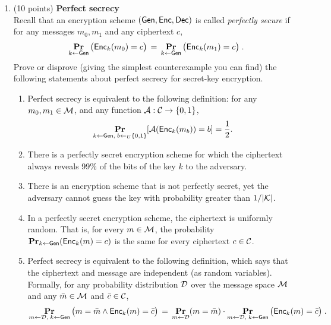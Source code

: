 \documentclass[12pt]{article}
\begin{document}
\begin{enumerate}
		

\item {(10 points)} {\bf Perfect secrecy}\\
Recall that an encryption scheme $ (\mathsf{Gen}, \mathsf{Enc}, \mathsf{Dec})$ is called \emph{perfectly secure} if for any messages $m_0,m_1$ and any ciphertext $c$, 
\[ \mathop{\bf Pr\/}_{k\gets \mathsf{Gen}}\big( \mathsf{Enc}_k(m_0)=c \big)\,=\, \mathop{\bf Pr\/}_{k\gets \mathsf{Gen}}\big( \mathsf{Enc}_k(m_1)=c \big)\;.\]
  Prove or disprove (giving the
  simplest counterexample you can find) the following statements about
  perfect secrecy for secret-key encryption. 
  \begin{enumerate}
\item Perfect secrecy is equivalent to the following
    definition:
  for any $m_{0}, m_{1} \in \mathcal{M}$, and any function
    $\mathcal{A} : \mathcal{C} \to \{0,1\}$,
    \[ \mathop{\bf Pr\/}_{k \gets \mathsf{Gen},\; b \gets_U \{0,1\}}[\mathcal{A}(\mathsf{Enc}_{k}(m_{b}))
    = b] = \frac{1}{2}. \]
    \item There is a perfectly secret encryption scheme for
    which the ciphertext always reveals 99\% of the bits of the key
    $k$ to the adversary.
\item There is an encryption scheme that is not perfectly secret, yet
    the adversary cannot guess the key with probability greater than $1/|\mathcal{K}|$.
\item In a perfectly secret encryption scheme, the
    ciphertext is uniformly random.  That is, for every $m \in
    \mathcal{M}$, the probability $\mathop{\bf Pr\/}_{k \gets \mathsf{Gen}}(\mathsf{Enc}_{k}(m)
    = {c})$ is the same for every ciphertext ${c} \in
    \mathcal{C}$.
\item Perfect secrecy is equivalent to the following
    definition, which says that the ciphertext and message are
    independent (as random variables).  Formally, for any probability
    distribution $\mathcal{D}$ over the message space $\mathcal{M}$ and any
    $\bar{m} \in \mathcal{M}$ and $\bar{c} \in \mathcal{C}$,
    \[ \mathop{\bf Pr\/}_{m \gets \mathcal{D},\; k \gets \mathsf{Gen}}\big( m = \bar{m} \wedge
    \mathsf{Enc}_{k}(m) = \bar{c}\big) \,=\, \mathop{\bf Pr\/}_{m \gets \mathcal{D}}(m = \bar{m})\cdot
    \mathop{\bf Pr\/}_{m \gets \mathcal{D},\; k \gets \mathsf{Gen}}\big(\mathsf{Enc}_{k}(m) =
    \bar{c}\big)\;. \]
  \end{enumerate}



\end{enumerate}
\end{document}
